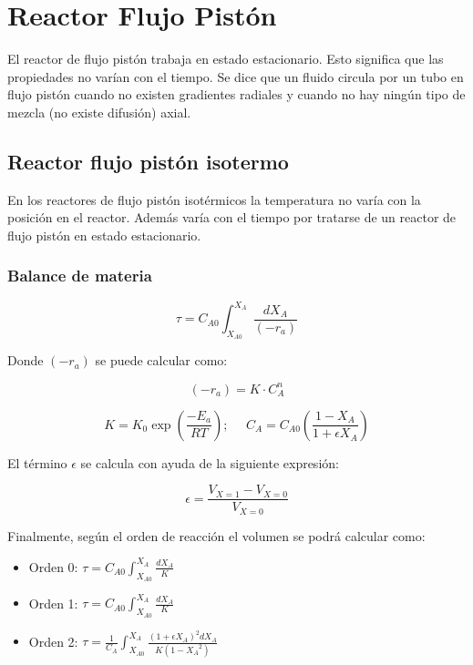 \documentclass[20pt,a4paper]{extarticle}
\begin{document}
		
\section{Reactor Flujo Pistón}
		
	El reactor de flujo pistón trabaja en estado estacionario. Esto significa que las propiedades no varían con el tiempo. Se dice que un fluido circula por un tubo en flujo pistón cuando no existen gradientes radiales y cuando no hay ningún tipo de mezcla (no existe difusión) axial.
		
	\subsection{Reactor flujo pistón isotermo}
		En los reactores de flujo pistón isotérmicos la temperatura no varía con la posición en el reactor. Además varía con el tiempo por tratarse de un reactor de flujo pistón en estado estacionario.
		
		\subsubsection{Balance de materia}
			\begin{equation*}
			\tau = C_{A0}\int_{X_{A0}}^{X_A}\frac{dX_A}{(-r_a)}
			\end{equation*}
			
			Donde $(-r_a)$ se puede calcular como:
			
			\begin{equation*}
			(-r_a) = K \cdot C_{A}^n
			\end{equation*}
			
			\begin{equation*}
			 K = K_0\exp\left(\frac{-E_a}{RT}\right);~~~~~~
			 C_{A} = C_{A0}(\frac{1 - X_A}{1 + \epsilon X_A})
			\end{equation*}
			
			El término $\epsilon$ se calcula con ayuda de la siguiente expresión:
			
			\begin{equation*}
			\epsilon = \frac{V_{X=1} - V_{X=0}}{V_{X=0}}
			\end{equation*}
			
			Finalmente, según el orden de reacción el volumen se podrá calcular como:
			
			\begin{itemize}
				\item Orden 0: $ \tau = C_{A0}\int_{X_{A0}}^{X_A}\frac{dX_A}K $
				
				\item Orden 1: $ \tau = C_{A0}\int_{X_{A0}}^{X_A}\frac{dX_A}K $
				
				\item Orden 2: $ \tau = \frac{1}{C_{A}}\int_{X_{A0}}^{X_A}\frac{(1+\epsilon X_A)^2dX_A}{K(1-{X_A}^2)} $
			
			\end{itemize}
		
\end{document}
